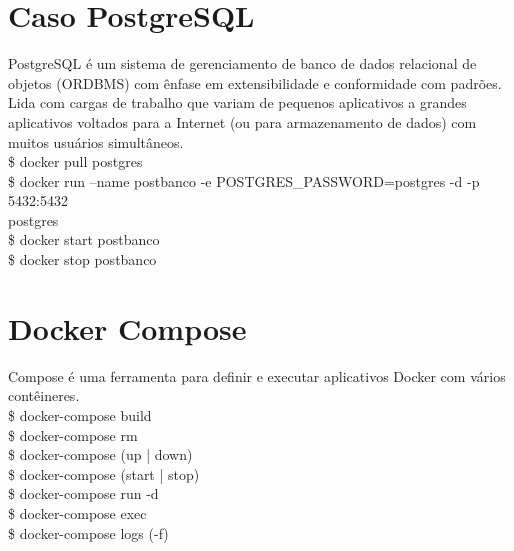 \documentclass[a4paper,11pt]{article}
\begin{document}
\section{Caso PostgreSQL}
PostgreSQL é um sistema de gerenciamento de banco de dados relacional de objetos (ORDBMS) com ênfase em extensibilidade e conformidade com padrões. Lida com cargas de trabalho que variam de pequenos aplicativos a grandes aplicativos voltados para a Internet (ou para armazenamento de dados) com muitos usuários simultâneos. \\
{\ttfamily\$ docker pull postgres} \\
{\ttfamily\$ docker run --name postbanco -e POSTGRES\_PASSWORD=postgres -d -p 5432:5432 \\ postgres} \\
{\ttfamily\$ docker start postbanco} \\
{\ttfamily\$ docker stop postbanco}

\section*{Docker Compose}
Compose é uma ferramenta para definir e executar aplicativos Docker com vários contêineres. \\
{\ttfamily\$ docker-compose build} \\
{\ttfamily\$ docker-compose rm} \\
{\ttfamily\$ docker-compose (up | down)} \\
{\ttfamily\$ docker-compose (start | stop)} \\
{\ttfamily\$ docker-compose run -d} \\
{\ttfamily\$ docker-compose exec} \\
{\ttfamily\$ docker-compose logs (-f)}
\end{document}
